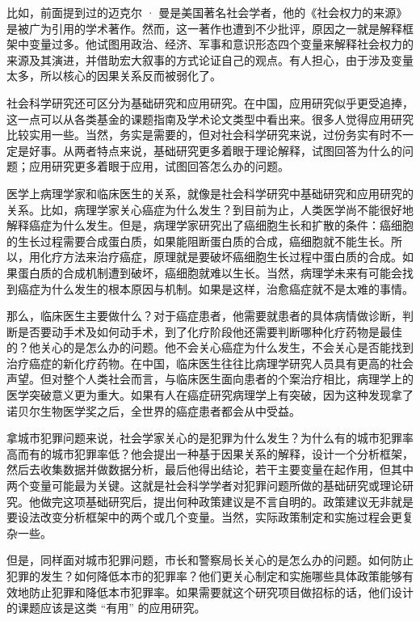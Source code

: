 比如，前面提到过的迈克尔 · 曼是美国著名社会学者，他的《社会权力的来源》是被广为引用的学术著作。然而，这一著作也遭到不少批评，原因之一就是解释框架中变量过多。他试图用政治、经济、军事和意识形态四个变量来解释社会权力的来源及其演进，并借助宏大叙事的方式论证自己的观点。有人担心，由于涉及变量太多，所以核心的因果关系反而被弱化了。

社会科学研究还可区分为基础研究和应用研究。在中国，应用研究似乎更受追捧，这一点可以从各类基金的课题指南及学术论文类型中看出来。很多人觉得应用研究比较实用一些。当然，务实是需要的，但对社会科学研究来说，过份务实有时不一定是好事。从两者特点来说，基础研究更多着眼于理论解释，试图回答为什么的问题；应用研究更多着眼于应用，试图回答怎么办的问题。

医学上病理学家和临床医生的关系，就像是社会科学研究中基础研究和应用研究的关系。比如，病理学家关心癌症为什么发生？到目前为止，人类医学尚不能很好地解释癌症为什么发生。但是，病理学家研究出了癌细胞生长和扩散的条件：癌细胞的生长过程需要合成蛋白质，如果能阻断蛋白质的合成，癌细胞就不能生长。所以，用化疗方法来治疗癌症，原理就是要破坏癌细胞生长过程中蛋白质的合成。如果蛋白质的合成机制遭到破坏，癌细胞就难以生长。当然，病理学未来有可能会找到癌症为什么发生的根本原因与机制。如果是这样，治愈癌症就不是太难的事情。

那么，临床医生主要做什么？对于癌症患者，他需要就患者的具体病情做诊断，判断是否要动手术及如何动手术，到了化疗阶段他还需要判断哪种化疗药物是最佳的？他关心的是怎么办的问题。他不会关心癌症为什么发生，不会关心是否能找到治疗癌症的新化疗药物。在中国，临床医生往往比病理学研究人员具有更高的社会声望。但对整个人类社会而言，与临床医生面向患者的个案治疗相比，病理学上的医学突破意义更为重大。如果有人在癌症研究病理学上有突破，因为这种发现拿了诺贝尔生物医学奖之后，全世界的癌症患者都会从中受益。

拿城市犯罪问题来说，社会学家关心的是犯罪为什么发生？为什么有的城市犯罪率高而有的城市犯罪率低？他会提出一种基于因果关系的解释，设计一个分析框架，然后去收集数据并做数据分析，最后他得出结论，若干主要变量在起作用，但其中两个变量可能最为关键。这就是社会科学学者对犯罪问题所做的基础研究或理论研究。他做完这项基础研究后，提出何种政策建议是不言自明的。政策建议无非就是要设法改变分析框架中的两个或几个变量。当然，实际政策制定和实施过程会更复杂一些。

但是，同样面对城市犯罪问题，市长和警察局长关心的是怎么办的问题。如何防止犯罪的发生？如何降低本市的犯罪率？他们更关心制定和实施哪些具体政策能够有效地防止犯罪和降低本市犯罪率。如果需要就这个研究项目做招标的话，他们设计的课题应该是这类 “有用” 的应用研究。

